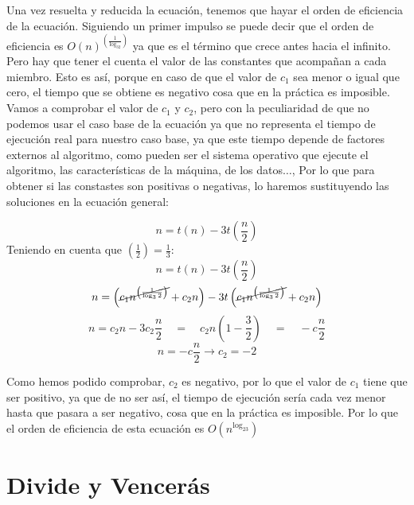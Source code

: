 \documentclass[10pt,a4paper,spanish]{report}
\theoremstyle{definition}
\theoremstyle{remark}
\begin{document}
Una vez resuelta y reducida la ecuación, tenemos que hayar el orden de eficiencia de la ecuación. Siguiendo un primer impulso se puede decir que el orden de eficiencia es $O\left(n\right)^{\left(\frac{1}{\log_32}\right)}$ ya que es el término que crece antes hacia el infinito. Pero hay que tener el cuenta el valor de las constantes que acompañan a cada miembro. Esto es así, porque en caso de que el valor de $c_1$ sea menor o igual que cero, el tiempo que se obtiene es negativo cosa que en la práctica es imposible. Vamos a comprobar el valor de $c_1$ y $c_2$, pero con la peculiaridad de que no podemos usar el caso base de la ecuación ya que no representa el tiempo de ejecución real para nuestro caso base, ya que este tiempo depende de factores externos al algoritmo, como pueden ser el sistema operativo que ejecute el algoritmo, las características de la máquina, de los datos$\ldots$, Por lo que para obtener si las constastes son positivas o negativas, lo haremos sustituyendo las soluciones en la ecuación general:
\begin{center}
\begin{displaymath}
  n = t(n) - 3t\left(\frac{n}{2}\right)
\end{displaymath}
Teniendo en cuenta que $\left(\frac{1}{2}\right) = \frac{1}{3}$:
\begin{displaymath}
  n = t(n) - 3t\left(\frac{n}{2}\right)
\end{displaymath}
\begin{displaymath}
  n = \left(\cancel{c_1n^{\left(\frac{1}{\log_32}\right)}} + c_2n\right) - 3t\left(\cancel{c_1n^{\left(\frac{1}{\log_32}\right)}} + c_2n\right)
\end{displaymath}
\begin{displaymath}
  n = c_2n -3c_2\frac{n}{2} \quad = \quad c_2n\left(1 - \frac{3}{2}\right) \quad = \quad -c\frac{n}{2}
\end{displaymath}
\begin{displaymath}
  n = -c\frac{n}{2} \longrightarrow c_2 = -2
\end{displaymath}
\end{center}

Como hemos podido comprobar, $c_2$ es negativo, por lo que el valor de $c_1$ tiene que ser positivo, ya que de no ser así, el tiempo de ejecución sería cada vez menor hasta que pasara a ser negativo, cosa que en la práctica es imposible. Por lo que el orden de eficiencia de esta ecuación es $O(n^{\log_23})$

\section{\textcolor[rgb]{0.1,0.2,1}Divide y \textcolor[rgb]{0.1,0.2,1}Vencerás}
\end{document}
